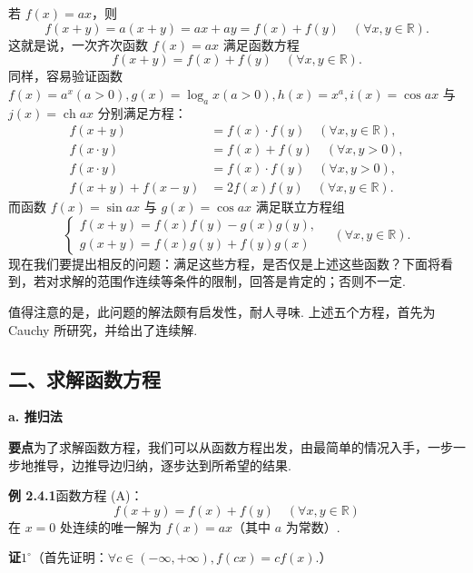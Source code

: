 \documentclass[UTF8,12pt,a4paper,fontset=fandol]{ctexart}
\begin{document}
若 $f(x)=ax$，则
\[
  f(x+y)=a(x+y)=ax+ay=f(x)+f(y)\quad(\forall x,y\in\mathbb{R}).
\]
这就是说，一次齐次函数 $f(x)=ax$ 满足函数方程
\[
  f(x+y)=f(x)+f(y)\quad(\forall x,y\in\mathbb{R}). \tag{A}
\]
同样，容易验证函数 $f(x)=a^x(a>0),g(x)=\log_a x(a>0),h(x)=x^a,i(x)=\cos ax$ 与 $j(x)=\operatorname{ch} ax$ 分别满足方程：
\begin{align}
f(x+y)&=f(x)\cdot f(y)\quad(\forall x,y\in\mathbb{R}), \tag{B}\\
f(x\cdot y)&=f(x)+f(y)\quad(\forall x,y>0), \tag{C}\\
f(x\cdot y)&=f(x)\cdot f(y)\quad(\forall x,y>0), \tag{D}\\
f(x+y)+f(x-y)&=2f(x)f(y)\quad(\forall x,y\in\mathbb{R}). \tag{E}
\end{align}
而函数 $f(x)=\sin ax$ 与 $g(x)=\cos ax$ 满足联立方程组
\[
\begin{cases}
f(x+y)=f(x)f(y)-g(x)g(y),\\
g(x+y)=f(x)g(y)+f(y)g(x)
\end{cases}
\quad(\forall x,y\in\mathbb{R}). \tag{F}
\]
现在我们要提出相反的问题：满足这些方程，是否仅是上述这些函数？下面将看到，若对求解的范围作连续等条件的限制，回答是肯定的；否则不一定.

值得注意的是，此问题的解法颇有启发性，耐人寻味. 上述五个方程，首先为 Cauchy 所研究，并给出了连续解.

\subsection*{二、求解函数方程}

\noindent\textbf{a. 推归法}

\noindent\textbf{要点}\quad 为了求解函数方程，我们可以从函数方程出发，由最简单的情况入手，一步一步地推导，边推导边归纳，逐步达到所希望的结果.

\noindent\textbf{例 2.4.1}\quad 函数方程 (A)：
\[
  f(x+y)=f(x)+f(y)\quad(\forall x,y\in\mathbb{R})
\]
在 $x=0$ 处连续的唯一解为 $f(x)=ax$（其中 $a$ 为常数）.

\noindent\textbf{证}\quad $1^\circ$（首先证明：$\forall c\in(-\infty,+\infty),f(cx)=cf(x)$.）
\end{document}
